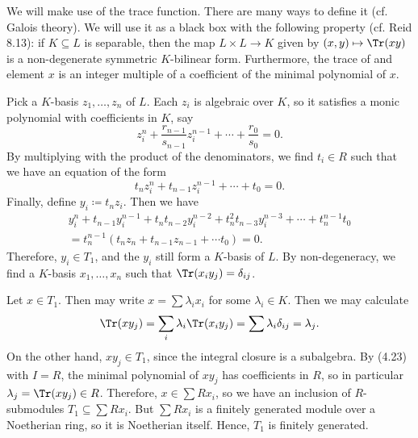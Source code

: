 We will make use of the trace function. There are many ways to define it
(cf. Galois theory). We will use it as a black box with the following
property (cf. Reid 8.13): if $K \subseteq L$ is separable, then the map
$L\times L\to K$ given by $(x, y)\mapsto \Tr(xy)$ is a non-degenerate
symmetric $K$-bilinear form. Furthermore, the trace of and element $x$ is an
integer multiple of a coefficient of the minimal polynomial of $x$.

Pick a $K$-basis $z_1, \ldots, z_n$ of $L$. Each $z_i$ is algebraic over $K$,
so it satisfies a monic polynomial with coefficients in $K$, say
\[ z_i^n + \frac{r_{n-1}}{s_{n-1}}z_i^{n-1} + \cdots + \frac{r_0}{s_0} = 0. \]
By multiplying with the product of the denominators, we find $t_i \in R$
such that we have an equation of the form
\[ t_nz_i^n + t_{n-1}z_i^{n-1} + \cdots + t_0 = 0. \]
Finally, define $y_i\coloneqq t_nz_i$. Then we have
\begin{multline*}
y_i^n + t_{n-1}y_i^{n-1} + t_nt_{n-2}y_i^{n-2} + t_n^2t_{n-3}y_i^{n-3} + \cdots + t_n^{n-1}t_0\\
	= t_n^{n-1}(t_nz_n + t_{n-1}z_{n-1}+\cdots t_0) = 0.
\end{multline*}
Therefore, $y_i \in T_1$, and the $y_i$ still form a $K$-basis of $L$.
By non-degeneracy, we find a $K$-basis $x_1, \ldots, x_n$ such that $\Tr(x_iy_j) = \delta_{ij}$.

Let $x \in T_1$. Then may write $x = \sum \lambda_i x_i$ for some $\lambda_i \in K$.
Then we may calculate
\[ \Tr(xy_j) = \sum_i\lambda_i \Tr(x_iy_j) = \sum\lambda_i\delta_{ij} = \lambda_j. \]
On the other hand, $xy_j \in T_1$, since the integral closure is a subalgebra.
By (4.23) with $I = R$, the minimal polynomial of $xy_j$ has coefficients in $R$,
so in particular $\lambda_j = \Tr(xy_j) \in R$. Therefore, $x \in \sum Rx_i$, so
we have an inclusion of $R$-submodules $T_1 \subseteq \sum Rx_i$. But
$\sum Rx_i$ is a finitely generated module over a Noetherian ring, so it is
Noetherian itself. Hence, $T_1$ is finitely generated.
